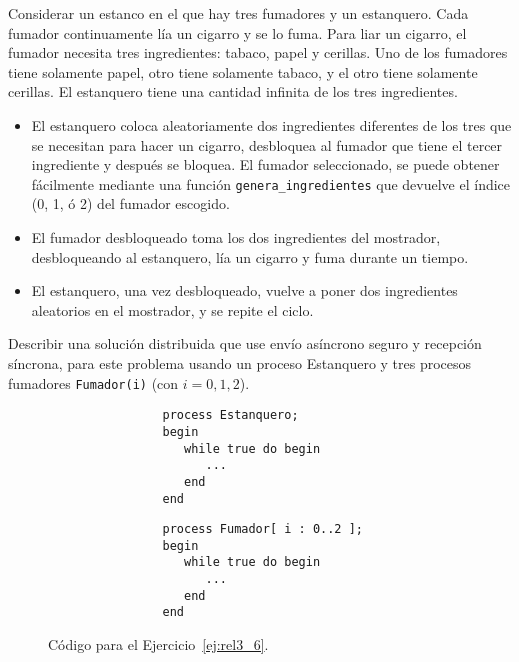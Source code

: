\begin{ejercicio}\label{ej:rel3_6}
    Considerar un estanco en el que hay tres fumadores y un estanquero. Cada fumador continuamente lía un cigarro y se lo fuma. Para liar un cigarro, el fumador necesita tres ingredientes: tabaco, papel y cerillas. Uno de los fumadores tiene solamente papel, otro tiene solamente tabaco, y el otro tiene solamente cerillas. El estanquero tiene una cantidad infinita de los tres ingredientes.
    \begin{itemize}
        \item El estanquero coloca aleatoriamente dos ingredientes diferentes de los tres que se necesitan para hacer un cigarro, desbloquea al fumador que tiene el tercer ingrediente y después se bloquea. El fumador seleccionado, se puede obtener fácilmente mediante una función \verb|genera_ingredientes| que devuelve el índice (0, 1, ó 2) del fumador escogido.
        \item El fumador desbloqueado toma los dos ingredientes del mostrador, desbloqueando al estanquero, lía un cigarro y fuma durante un tiempo.
        \item El estanquero, una vez desbloqueado, vuelve a poner dos ingredientes aleatorios en el mostrador, y se repite el ciclo.
    \end{itemize}
    Describir una solución distribuida que use envío asíncrono seguro y recepción síncrona, para este problema usando un proceso Estanquero y tres procesos fumadores \verb|Fumador(i)| (con $i=0, 1, 2$).

    \begin{figure}[H]
        \centering
        \setlength{\columnsep}{1cm}
        \begin{multicols}{2}
            \begin{verbatim}
                process Estanquero;
                begin
                   while true do begin
                      ... 
                   end
                end
            \end{verbatim}
            \begin{verbatim}
                process Fumador[ i : 0..2 ];
                begin
                   while true do begin
                      ...
                   end
                end
            \end{verbatim}
        \end{multicols}
        \caption{Código para el Ejercicio~\ref{ej:rel3_6}.}
        \label{fig:cod_6}
    \end{figure}
\end{ejercicio}

